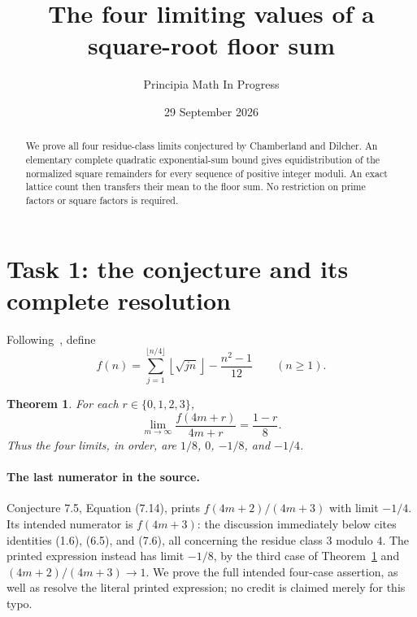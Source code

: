 \documentclass[11pt]{article}
\title{The four limiting values of a square-root floor sum}
\author{Principia Math In Progress}
\date{29 September 2026}
\newtheorem{theorem}{Theorem}
\newcommand{\fl}[1]{\left\lfloor#1\right\rfloor}
\begin{document}
\maketitle
\begin{abstract}
We prove all four residue-class limits conjectured by Chamberland and
Dilcher. An elementary complete quadratic exponential-sum bound gives
equidistribution of the normalized square remainders for every sequence
of positive integer moduli. An exact lattice count then transfers their
mean to the floor sum. No restriction on prime factors or square factors
is required.
\end{abstract}

\section*{Task 1: the conjecture and its complete resolution}
Following~\cite[Equation (1.4)]{CD}, define
\[
 f(n)=\sum_{j=1}^{\lfloor n/4\rfloor}\fl{\sqrt{jn}}-\frac{n^2-1}{12}
 \qquad(n\ge1).
\]
\begin{theorem}\label{thm:main}
For each $r\in\{0,1,2,3\}$,
\[
 \lim_{m\to\infty}\frac{f(4m+r)}{4m+r}=\frac{1-r}{8}.
\]
Thus the four limits, in order, are $1/8$, $0$, $-1/8$, and $-1/4$.
\end{theorem}

\paragraph{The last numerator in the source.}
Conjecture 7.5, Equation (7.14), prints $f(4m+2)/(4m+3)$ with
limit $-1/4$. Its intended numerator is $f(4m+3)$: the discussion
immediately below cites identities (1.6), (6.5), and (7.6), all concerning
the residue class $3$ modulo $4$.
The printed expression instead has limit $-1/8$, by the third case of
Theorem~\ref{thm:main} and $(4m+2)/(4m+3)\to1$.
We prove the full intended four-case assertion, as well as resolve the
literal printed expression; no credit is claimed merely for this typo.
\end{document}
